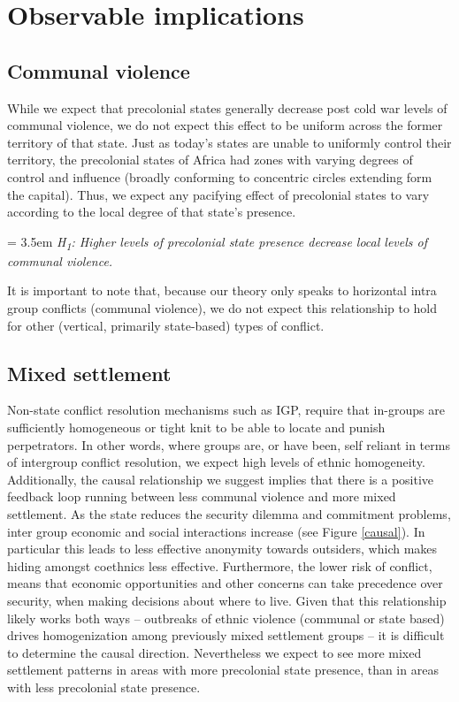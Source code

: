 \section{Observable implications} \label{Observable implications}

\subsection{Communal violence} \label{Communal violence}

While we expect that precolonial states generally decrease post cold war levels
of communal violence, we do not expect this effect to be uniform across the
former territory of that state. Just as today's states are unable to uniformly
control their territory, the precolonial states of Africa had zones with varying
degrees of control and influence (broadly conforming to concentric circles
extending form the capital). Thus, we expect any pacifying effect of precolonial
states to vary according to the local degree of that state's presence.

\bigskip
\hangindent = 3.5em \textit{H\textsubscript{1}: Higher levels of precolonial
	state presence decrease local levels of communal violence.}
\bigskip

It is important to note that, because our theory only speaks to horizontal intra
group conflicts (communal violence), we do not expect this relationship to hold
for other (vertical, primarily state-based) types of conflict. 

\subsection{Mixed settlement} \label{Mixed settlement}

Non-state conflict resolution mechanisms such as IGP, require that in-groups are
sufficiently homogeneous or tight knit to be able to locate and punish
perpetrators. In other words, where groups are, or have been, self reliant in
terms of intergroup conflict resolution, we expect high levels of ethnic
homogeneity. Additionally, the causal relationship we suggest implies that there
is a positive feedback loop running between less communal violence and more
mixed settlement. As the state reduces the security dilemma and commitment
problems, inter group economic and social interactions increase (see Figure
\ref{causal}). In particular this leads to less effective anonymity towards
outsiders, which makes hiding amongst coethnics less effective. Furthermore, the
lower risk of conflict, means that economic opportunities and other concerns can
take precedence over security, when making decisions about where to live. Given
that this relationship likely works both ways -- outbreaks of ethnic violence
(communal or state based) drives homogenization among previously mixed
settlement groups -- it is difficult to determine the causal direction.
Nevertheless we expect to see more mixed settlement patterns in areas with more
precolonial state presence, than in areas with less precolonial state presence.

